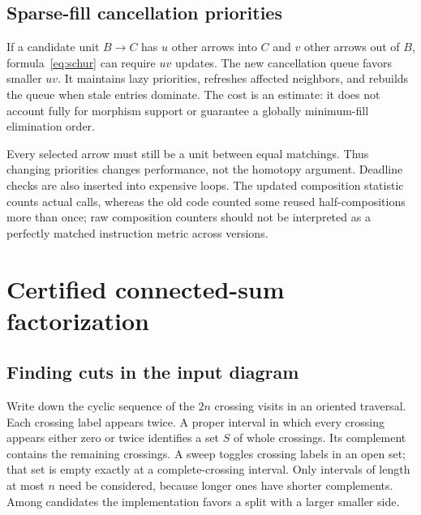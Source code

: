 \documentclass[11pt,letterpaper]{article}
\theoremstyle{definition}
\begin{document}
\subsection{Sparse-fill cancellation priorities}

If a candidate unit $B\to C$ has $u$ other arrows into $C$ and $v$ other arrows
out of $B$, formula~\eqref{eq:schur} can require $uv$ updates. The new cancellation
queue favors smaller $uv$. It maintains lazy priorities, refreshes affected
neighbors, and rebuilds the queue when stale entries dominate. The cost is an
estimate: it does not account fully for morphism support or guarantee a globally
minimum-fill elimination order.

Every selected arrow must still be a unit between equal matchings. Thus changing
priorities changes performance, not the homotopy argument. Deadline checks are
also inserted into expensive loops. The updated composition statistic counts
actual calls, whereas the old code counted some reused half-compositions more
than once; raw composition counters should not be interpreted as a perfectly
matched instruction metric across versions.

\section[Connected-sum factors]{Certified connected-sum factorization}\label{sec:factors}

\subsection{Finding cuts in the input diagram}

Write down the cyclic sequence of the $2n$ crossing visits in an oriented
traversal. Each crossing label appears twice. A proper interval in which every
crossing appears either zero or twice identifies a set $S$ of whole crossings.
Its complement contains the remaining crossings. A sweep toggles crossing labels
in an open set; that set is empty exactly at a complete-crossing interval.
Only intervals of length at most $n$ need be considered, because longer ones
have shorter complements. Among candidates the implementation favors a split
with a larger smaller side.
\end{document}
